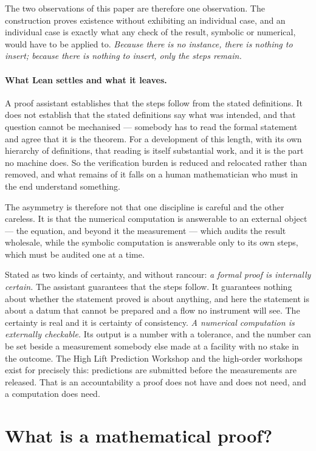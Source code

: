 \documentclass[11pt]{article}
\begin{document}
The two observations of this paper are therefore one observation. The construction proves existence
without exhibiting an individual case, and an individual case is exactly what any check of the
result, symbolic or numerical, would have to be applied to. \emph{Because there is no instance, there
is nothing to insert; because there is nothing to insert, only the steps remain.}

\paragraph{What Lean settles and what it leaves.} A proof assistant establishes that the steps follow
from the stated definitions. It does not establish that the stated definitions say what was intended,
and that question cannot be mechanised --- somebody has to read the formal statement and agree that
it is the theorem. For a development of this length, with its own hierarchy of definitions, that
reading is itself substantial work, and it is the part no machine does. So the verification burden is
reduced and relocated rather than removed, and what remains of it falls on a human mathematician who
must in the end understand something.

The asymmetry is therefore not that one discipline is careful and the other careless. It is that the
numerical computation is answerable to an external object --- the equation, and beyond it the
measurement --- which audits the result wholesale, while the symbolic computation is answerable only
to its own steps, which must be audited one at a time.

Stated as two kinds of certainty, and without rancour: \emph{a formal proof is internally certain.}
The assistant guarantees that the steps follow. It guarantees nothing about whether the statement
proved is about anything, and here the statement is about a datum that cannot be prepared and a flow
no instrument will see. The certainty is real and it is certainty of consistency. \emph{A numerical
computation is externally checkable.} Its output is a number with a tolerance, and the number can be
set beside a measurement somebody else made at a facility with no stake in the outcome. The High
Lift Prediction Workshop and the high-order workshops exist for precisely this: predictions are
submitted before the measurements are released. That is an accountability a proof does not have and
does not need, and a computation does need.

\section{What is a mathematical proof?}\label{sec:proof}
\end{document}
